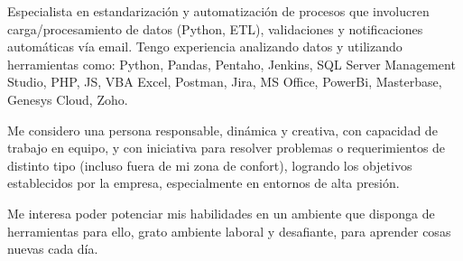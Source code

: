 

\begin{cvparagraph}

Especialista en estandarización y automatización de procesos que involucren carga/procesamiento de datos (Python, ETL), validaciones y notificaciones automáticas vía email. Tengo experiencia analizando datos y utilizando herramientas como: Python, Pandas, Pentaho, Jenkins, SQL Server Management Studio, PHP, JS, VBA Excel, Postman, Jira, MS Office, PowerBi, Masterbase, Genesys Cloud, Zoho.

Me considero una persona responsable, dinámica y creativa, con capacidad de trabajo en equipo, y con iniciativa para resolver problemas o requerimientos de distinto tipo (incluso fuera de mi zona de confort), logrando los objetivos establecidos por la empresa, especialmente en entornos de alta presión.

Me interesa poder potenciar mis habilidades en un ambiente que disponga de herramientas para ello, grato ambiente laboral y desafiante, para aprender cosas nuevas cada día.

\end{cvparagraph}
